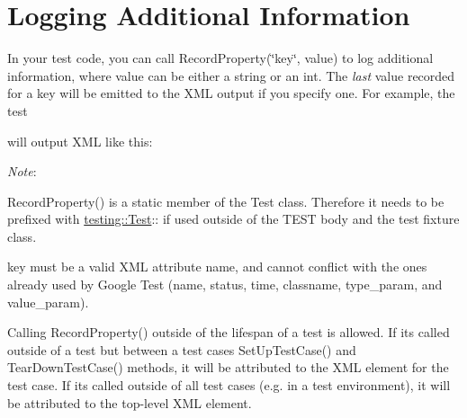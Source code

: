 \section*{Logging Additional Information}

In your test code, you can call {\ttfamily Record\+Property(\char`\"{}key\char`\"{}, value)} to log additional information, where {\ttfamily value} can be either a string or an {\ttfamily int}. The {\itshape last} value recorded for a key will be emitted to the X\+ML output if you specify one. For example, the test


\begin{DoxyCode}{0}
\DoxyCodeLine{\}}
\end{DoxyCode}


will output X\+ML like this\+:


\begin{DoxyCode}{0}
\end{DoxyCode}


{\itshape Note}\+:
\begin{DoxyItemize}
\item {\ttfamily Record\+Property()} is a static member of the {\ttfamily Test} class. Therefore it needs to be prefixed with {\ttfamily \mbox{\hyperlink{classtesting_1_1_test}{testing\+::\+Test}}\+:\+:} if used outside of the {\ttfamily T\+E\+ST} body and the test fixture class.
\item {\ttfamily key} must be a valid X\+ML attribute name, and cannot conflict with the ones already used by Google Test ({\ttfamily name}, {\ttfamily status}, {\ttfamily time}, {\ttfamily classname}, {\ttfamily type\+\_\+param}, and {\ttfamily value\+\_\+param}).
\item Calling {\ttfamily Record\+Property()} outside of the lifespan of a test is allowed. If it\textquotesingle{}s called outside of a test but between a test case\textquotesingle{}s {\ttfamily Set\+Up\+Test\+Case()} and {\ttfamily Tear\+Down\+Test\+Case()} methods, it will be attributed to the X\+ML element for the test case. If it\textquotesingle{}s called outside of all test cases (e.\+g. in a test environment), it will be attributed to the top-\/level X\+ML element.
\end{DoxyItemize}

